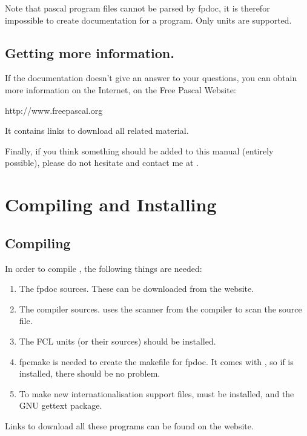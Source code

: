 Note that pascal program files cannot be parsed by fpdoc, it is therefor 
impossible to create documentation for a program. Only units are supported.

\section{Getting more information.}
If the documentation doesn't give an answer to your questions,
you can obtain more information on the Internet, on the Free Pascal Website: 

{http://www.freepascal.org} 

It contains links to download all \fpdoc related material.

Finally, if you think something should be added to this manual
(entirely possible), please do not hesitate and contact me at
.

\chapter{Compiling and Installing \fpdoc}
\label{ch:Installation}

\section{Compiling}
In order to compile \fpdoc, the following things are needed:
\begin{enumerate}
\item The fpdoc sources. These can be downloaded from the \fpdoc website.
\item The \fpc compiler sources. \fpdoc uses the scanner from the \fpc
compiler to scan the source file.
\item The FCL units (or their sources) should be installed. 
\item fpcmake is needed to create the makefile for fpdoc. It comes with
\fpc, so if \fpc is installed, there should be no problem.
\item To make new internationalisation support files,  must be
installed, and the GNU gettext package.
\end{enumerate}
Links to download all these programs can be found on the \fpdoc website.


